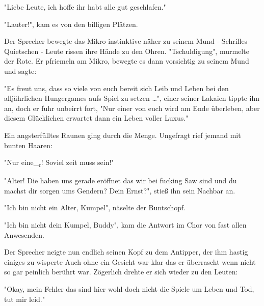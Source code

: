 \documentclass[ebook]{article}
\begin{document}
\begin{center}
"Liebe Leute, ich hoffe ihr habt alle gut geschlafen."
\end{center}

\begin{center}
"Lauter!", kam es von den billigen Plätzen.
\end{center}

\noindent Der Sprecher bewegte das Mikro instinktive näher zu seinem
Mund - Schrilles Quietschen - Leute rissen ihre Hände zu den
Ohren. "Tschuldigung", murmelte der Rote. Er pfriemeln am Mikro,
bewegte es dann vorsichtig zu seinem Mund und sagte:

\begin{center}
"Es freut uns, dass so viele von euch bereit sich Leib und Leben bei
den alljährlichen Hungergames aufs Spiel zu setzen \ldots{}", einer
seiner Lakaien tippte ihn an, doch er fuhr unbeirrt fort, "Nur einer
von euch wird am Ende überleben, aber diesem Glücklichen erwartet
dann ein Leben voller Luxus."
\end{center}

\noindent Ein angsterfülltes Raunen ging durch die Menge. Ungefragt
rief jemand mit bunten Haaren:

\begin{center}
"Nur eine\_\textsubscript{r}!  Soviel zeit muss sein!"
\end{center}

\begin{center}
"Alter! Die haben uns gerade eröffnet das wir bei fucking Saw sind
und du machst dir sorgen ums Gendern? Dein Ernst?", stieß ihn sein
Nachbar an.
\end{center}

\begin{center}
"Ich bin nicht ein Alter, Kumpel", näselte der Buntschopf.
\end{center}

\begin{center}
"Ich bin nicht dein Kumpel, Buddy", kam die Antwort im Chor von fast
allen Anwesenden.
\end{center}

\noindent Der Sprecher neigte nun endlich seinen Kopf zu dem
Antipper, der ihm hastig einiges zu wisperte Auch ohne ein Gesicht
war klar das er überrascht wenn nicht so gar peinlich berührt
war. Zögerlich drehte er sich wieder zu den Leuten:

\begin{center}
"Okay, mein Fehler das sind hier wohl doch nicht die Spiele um Leben
und Tod, tut mir leid."
\end{center}
\end{document}
